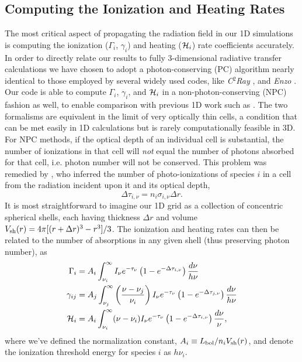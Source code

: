\documentclass[letterpaper,titlepage,12pt]{article}
\numberwithin{equation}{section}
\begin{document}
\subsection{Computing the Ionization and Heating Rates}
The most critical aspect of propagating the radiation field in our 1D
simulations is computing the ionization ($\Gamma_i$, $\gamma_{i}$) and heating
($\mathcal{H}_i$) rate coefficients accurately. In order to directly relate our
results to fully 3-dimensional radiative transfer calculations we have chosen
to adopt a photon-conserving (PC) algorithm nearly identical to those employed
by several widely used codes, like \textit{C$^2$Ray} \citep{Mellema2006}, and
\textit{Enzo} \citep{Wise2011}. Our code is able to compute $\Gamma_i$,
$\gamma_{i}$, and $\mathcal{H}_i$ in a non-photon-conserving (NPC) fashion as well,
to enable comparison with previous 1D work such as \citet{Thomas2008}. The two
formalisms are equivalent in the limit of very optically thin cells, a
condition that can be met easily in 1D calculations but is rarely
computationally feasible in 3D. For NPC methods, if the optical depth of an
individual cell is substantial, the number of ionizations in that cell will
\textit{not} equal the number of photons absorbed for that cell, i.e. photon
number will not be conserved. This problem was remedied by \citet{Abel1999},
who inferred the number of photo-ionizations of species $i$ in a cell from the
radiation incident upon it and its optical depth,
\begin{equation}
    \Delta \tau_{i,\nu} = n_i \sigma_{i,\nu} \Delta r .
\end{equation}    
It is most straightforward to imagine our 1D grid as a collection of
concentric spherical shells, each having thickness $\Delta r$ and volume
$V_{\mathrm{sh}}(r) = 4 \pi [(r + \Delta r)^3 - r^3] / 3$. The ionization and heating
rates can then be related to the number of absorptions in any given shell
(thus preserving photon number), as
\begin{align}
    \Gamma_i & = A_i \int_{\nu_i}^{\infty} I_{\nu} e^{-\tau_{\nu}} \left(1 - e^{-\Delta \tau_{i,\nu}}\right) \frac{d\nu}{h\nu} \label{eq:PhotoIonizationRate} \\
    \gamma_{ij} & = A_j \int_{\nu_j}^{\infty} \left(\frac{\nu - \nu_j}{\nu_i}\right) I_{\nu} e^{-\tau_{\nu}} \left(1 - e^{-\Delta \tau_{j,\nu}}\right) \frac{d\nu}{h\nu} \label{eq:SecondaryIonizationRate} \\
    \mathcal{H}_i & = A_i \int_{\nu_i}^{\infty} (\nu - \nu_i) I_{\nu} e^{-\tau_{\nu}} \left(1 - e^{-\Delta \tau_{i,\nu}}\right) \frac{d\nu}{\nu} , \label{eq:HeatingRate}
\end{align}    
where we've defined the normalization constant, $A_i \equiv
L_{\mathrm{bol}}/n_i V_{\mathrm{sh}}(r)$, and denote the ionization threshold energy
for species $i$ as $h\nu_i$. 
\end{document}
